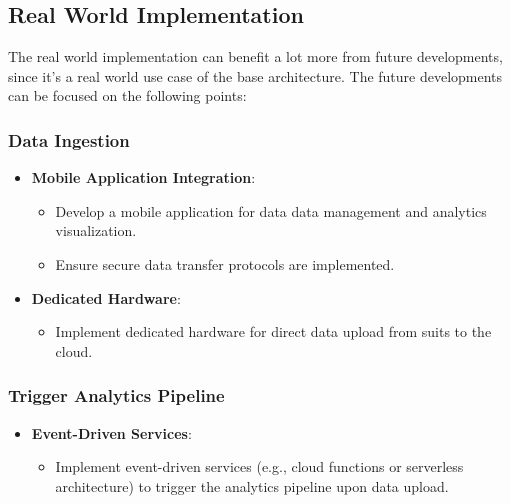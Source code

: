 \subsection{Real World Implementation}

The real world implementation can benefit a lot more from future developments, since it's a real world use case of the base architecture. The future developments can be focused on the following points:

\subsubsection{Data Ingestion}
\begin{itemize}
    \item \textbf{Mobile Application Integration}:
        \begin{itemize}
            \item Develop a mobile application for data data management and analytics visualization.
            \item Ensure secure data transfer protocols are implemented.
        \end{itemize}
    \item \textbf{Dedicated Hardware}:
        \begin{itemize}
            \item Implement dedicated hardware for direct data upload from suits to the cloud.
        \end{itemize}
\end{itemize}

\subsubsection{Trigger Analytics Pipeline}
\begin{itemize}
    \item \textbf{Event-Driven Services}:
        \begin{itemize}
            \item Implement event-driven services (e.g., cloud functions or serverless architecture) to trigger the analytics pipeline upon data upload.
        \end{itemize}
\end{itemize}

